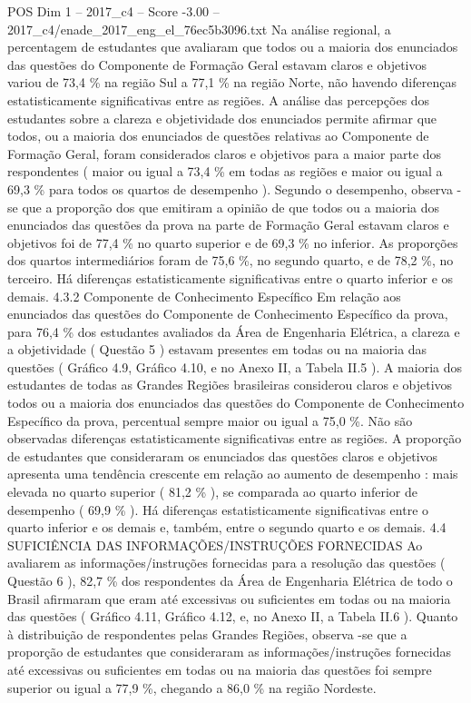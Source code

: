 \begin{textsample}{POS Dim 1 – 2017\_c4 – Score -3.00 – 2017\_c4/enade\_2017\_eng\_el\_76ec5b3096.txt}
Na análise regional, a percentagem de estudantes que avaliaram que todos ou a maioria dos enunciados das questões do Componente de Formação Geral estavam claros e objetivos variou de 73,4 \% na região Sul a 77,1 \% na região Norte, não havendo diferenças estatisticamente significativas entre as regiões.
A análise das percepções dos estudantes sobre a clareza e objetividade dos enunciados permite afirmar que todos, ou a maioria dos enunciados de questões relativas ao Componente de Formação Geral, foram considerados claros e objetivos para a maior parte dos respondentes ( maior ou igual a 73,4 \% em todas as regiões e maior ou igual a 69,3 \% para todos os quartos de desempenho ).
Segundo o desempenho, observa -se que a proporção dos que emitiram a opinião de que todos ou a maioria dos enunciados das questões da prova na parte de Formação Geral estavam claros e objetivos foi de 77,4 \% no quarto superior e de 69,3 \% no inferior.
As proporções dos quartos intermediários foram de 75,6 \%, no segundo quarto, e de 78,2 \%, no terceiro.
Há diferenças estatisticamente significativas entre o quarto inferior e os demais. 4.3.2 Componente de Conhecimento Específico Em relação aos enunciados das questões do Componente de Conhecimento Específico da prova, para 76,4 \% dos estudantes avaliados da Área de Engenharia Elétrica, a clareza e a objetividade ( Questão 5 ) estavam presentes em todas ou na maioria das questões ( Gráfico 4.9, Gráfico 4.10, e no Anexo II, a Tabela II.5 ).
A maioria dos estudantes de todas as Grandes Regiões brasileiras considerou claros e objetivos todos ou a maioria dos enunciados das questões do Componente de Conhecimento Específico da prova, percentual sempre maior ou igual a 75,0 \%.
Não são observadas diferenças estatisticamente significativas entre as regiões.
A proporção de estudantes que consideraram os enunciados das questões claros e objetivos apresenta uma tendência crescente em relação ao aumento de desempenho : mais elevada no quarto superior ( 81,2 \% ), se comparada ao quarto inferior de desempenho ( 69,9 \% ).
Há diferenças estatisticamente significativas entre o quarto inferior e os demais e, também, entre o segundo quarto e os demais. 4.4 SUFICIÊNCIA DAS INFORMAÇÕES/INSTRUÇÕES FORNECIDAS Ao avaliarem as informações/instruções fornecidas para a resolução das questões ( Questão 6 ), 82,7 \% dos respondentes da Área de Engenharia Elétrica de todo o Brasil afirmaram que eram até excessivas ou suficientes em todas ou na maioria das questões ( Gráfico 4.11, Gráfico 4.12, e, no Anexo II, a Tabela II.6 ).
Quanto à distribuição de respondentes pelas Grandes Regiões, observa -se que a proporção de estudantes que consideraram as informações/instruções fornecidas até excessivas ou suficientes em todas ou na maioria das questões foi sempre superior ou igual a 77,9 \%, chegando a 86,0 \% na região Nordeste.

\end{textsample}
